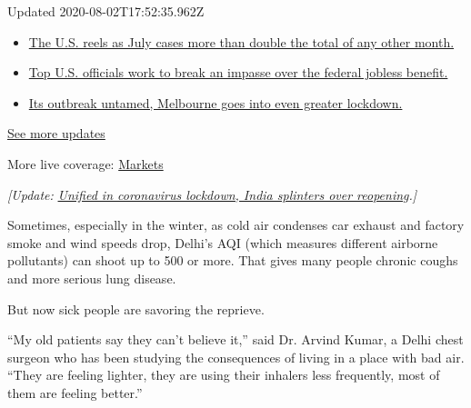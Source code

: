 Updated 2020-08-02T17:52:35.962Z

\begin{itemize}
\tightlist
\item
  \href{https://www.nytimes.com/2020/08/01/world/coronavirus-covid-19.html?action=click\&pgtype=Article\&state=default\&region=MAIN_CONTENT_1\&context=storylines_live_updates\#link-34047410}{The
  U.S. reels as July cases more than double the total of any other
  month.}
\item
  \href{https://www.nytimes.com/2020/08/01/world/coronavirus-covid-19.html?action=click\&pgtype=Article\&state=default\&region=MAIN_CONTENT_1\&context=storylines_live_updates\#link-780ec966}{Top
  U.S. officials work to break an impasse over the federal jobless
  benefit.}
\item
  \href{https://www.nytimes.com/2020/08/01/world/coronavirus-covid-19.html?action=click\&pgtype=Article\&state=default\&region=MAIN_CONTENT_1\&context=storylines_live_updates\#link-2bc8948}{Its
  outbreak untamed, Melbourne goes into even greater lockdown.}
\end{itemize}

\href{https://www.nytimes.com/2020/08/01/world/coronavirus-covid-19.html?action=click\&pgtype=Article\&state=default\&region=MAIN_CONTENT_1\&context=storylines_live_updates}{See
more updates}

More live coverage:
\href{https://www.nytimes.com/live/2020/07/31/business/stock-market-today-coronavirus?action=click\&pgtype=Article\&state=default\&region=MAIN_CONTENT_1\&context=storylines_live_updates}{Markets}

\emph{{[}Update:}
\href{http://www.nytimes.com/2020/04/28/world/asia/india-coronavirus-lockdown.html}{\emph{Unified
in coronavirus lockdown, India splinters over reopening}}\emph{.{]}}

Sometimes, especially in the winter, as cold air condenses car exhaust
and factory smoke and wind speeds drop, Delhi's AQI (which measures
different airborne pollutants) can shoot up to 500 or more. That gives
many people chronic coughs and more serious lung disease.

But now sick people are savoring the reprieve.

``My old patients say they can't believe it,'' said Dr. Arvind Kumar, a
Delhi chest surgeon who has been studying the consequences of living in
a place with bad air. ``They are feeling lighter, they are using their
inhalers less frequently, most of them are feeling better.''

